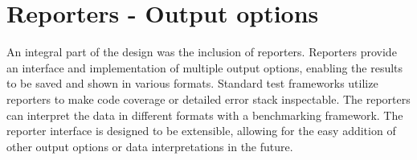 \section{Reporters - Output options}

An integral part of the design was the inclusion of reporters. Reporters provide
an interface and implementation of multiple output options, enabling the results
to be saved and shown in various formats. Standard test frameworks utilize
reporters to make code coverage or detailed error stack inspectable. The
reporters can interpret the data in different formats with a benchmarking
framework. The reporter interface is designed to be extensible, allowing for the
easy addition of other output options or data interpretations in the future.